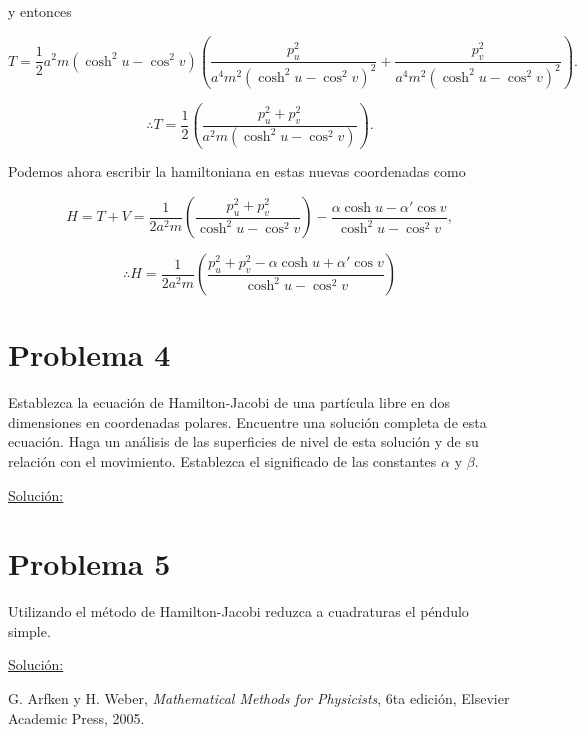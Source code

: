 \documentclass[a4paper,10pt]{article}
\numberwithin{equation}{section}
\begin{document}
y entonces 

\begin{equation}
 T = \frac{1}{2}a^2m(\cosh^2{u} - \cos^2{v})\left( \frac{p_u^2}{a^4m^2(\cosh^2{u} - \cos^2{v})^2} 
 + \frac{p_v^2}{a^4m^2(\cosh^2{u} - \cos^2{v})^2}\right).
\end{equation}

\begin{equation}
 \therefore T = \frac{1}{2}\left( \frac{p_u^2 + p_v^2}{a^2m(\cosh^2{u} - \cos^2{v})}\right).
\end{equation}


Podemos ahora escribir la hamiltoniana en estas nuevas coordenadas como 

\begin{equation}
 H = T + V = \frac{1}{2a^2m}\left( \frac{p_u^2 + p_v^2}{\cosh^2{u} - \cos^2{v}}\right) - \frac{\alpha \cosh{u} - \alpha'\cos{v}}{\cosh^2{u}- \cos^2{v}},
\end{equation}

\begin{equation}
 \therefore H = \frac{1}{2a^2m}\left( \frac{p_u^2 + p_v^2 - \alpha \cosh{u} + \alpha'\cos{v}}{\cosh^2{u}- \cos^2{v}}\right)
\end{equation}










\section{Problema 4}

Establezca la ecuación de Hamilton-Jacobi de una partícula libre en dos dimensiones 
en coordenadas polares. Encuentre una solución completa de esta ecuación. Haga un 
análisis de las superficies de nivel de esta solución y de su relación con el movimiento. 
Establezca el significado de las constantes $\alpha$ y $\beta$.

\vspace{.3cm}

\underline{Solución:} \vspace{.3cm}

\section{Problema 5}

Utilizando el método de Hamilton-Jacobi reduzca a cuadraturas el péndulo simple. 

\vspace{.3cm}

\underline{Solución:} \vspace{.3cm}

\begin{thebibliography}{10}
G. Arfken y H. Weber, \emph{Mathematical Methods for Physicists}, 6ta edición, Elsevier 
Academic Press, 2005.
\end{thebibliography}
\end{document}
